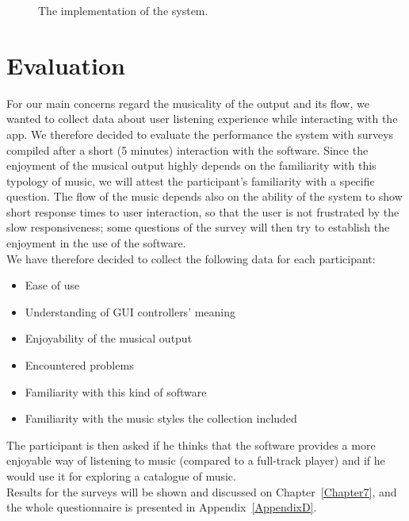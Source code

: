 \begin{figure}[bt]
\caption{The implementation of the system.}
\label{fig:extraction}
\end{figure}

\section{Evaluation}
\label{sec:evaluation_idea}
For our main concerns regard the musicality of the output and its flow, we wanted to collect data about user listening experience while interacting with the app. We therefore decided to evaluate the performance the system with surveys compiled after a short (5 minutes) interaction with the software. Since the enjoyment of the musical output highly depends on the familiarity with this typology of music, we will attest the participant's familiarity with a specific question. The flow of the music depends also on the ability of the system to show short response times to user interaction, so that the user is not frustrated by the slow responsiveness; some questions of the survey will then try to establish the enjoyment in the use of the software.\\
We have therefore decided to collect the following data for each participant:
\begin{itemize}
\item Ease of use
\item Understanding of GUI controllers' meaning
\item Enjoyability of the musical output
\item Encountered problems
\item Familiarity with this kind of software
\item Familiarity with the music styles the collection included 
\end{itemize}

The participant is then asked if he thinks that the software provides a more enjoyable way of listening to music (compared to a full-track player) and if he would use it for exploring a catalogue of music. \\
Results for the surveys will be shown and discussed on Chapter~\ref{Chapter7}, and the whole questionnaire is presented in Appendix~\ref{AppendixD}.